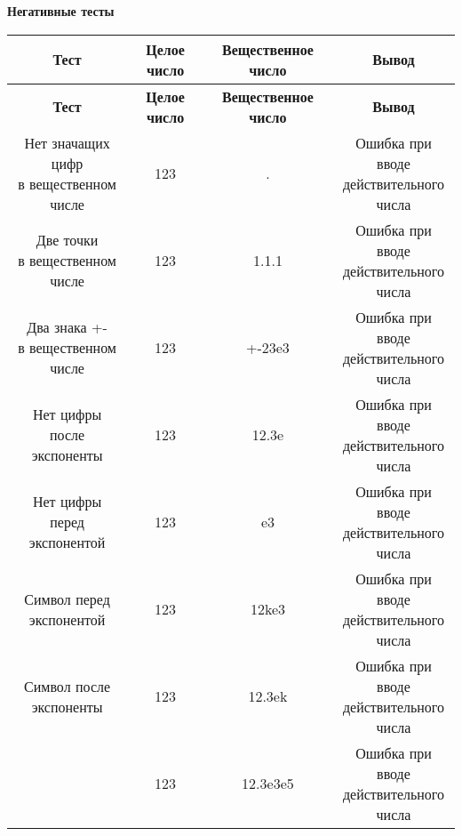 {\noindent \textbf {Негативные тесты}}
\begin{longtable}{|c|c|c|c|}
	\hline
	\textbf{Тест} & \textbf{Целое число} & \textbf{Вещественное число} & \textbf{Вывод} \\
	\hline
	\endfirsthead
	\hline
	\textbf{Тест} & \textbf{Целое число} & \textbf{Вещественное число} & \textbf{Вывод} \\
	\hline
	\endhead
	\makecell{Нет значащих цифр\\в вещественном\\числе} & 123 & . & \makecell{Ошибка при вводе\\действительного\\числа} \\
	\hline
	\makecell{Две точки\\в вещественном\\числе} & 123 & 1.1.1 & \makecell{Ошибка при вводе\\действительного\\числа} \\
	\hline
	\makecell{Два знака +-\\в вещественном\\числе} & 123 & +-23e3 & \makecell{Ошибка при вводе\\действительного\\числа} \\
	\hline
	\makecell{Нет цифры после\\экспоненты} & 123 & 12.3e & \makecell{Ошибка при вводе\\действительного\\числа} \\
	\hline
	\makecell{Нет цифры перед\\экспонентой} & 123 & e3 & \makecell{Ошибка при вводе\\действительного\\числа} \\
	\hline
	\makecell{Символ перед\\экспонентой} & 123 & 12ke3 & \makecell{Ошибка при вводе\\действительного\\числа} \\
	\hline
	\makecell{Символ после\\экспоненты} & 123 & 12.3ek & \makecell{Ошибка при вводе\\действительного\\числа} \\
	\hline
	\makecell{Две экспоненты} & 123 & 12.3e3e5 & \makecell{Ошибка при вводе\\действительного\\числа} \\

\end{longtable}
